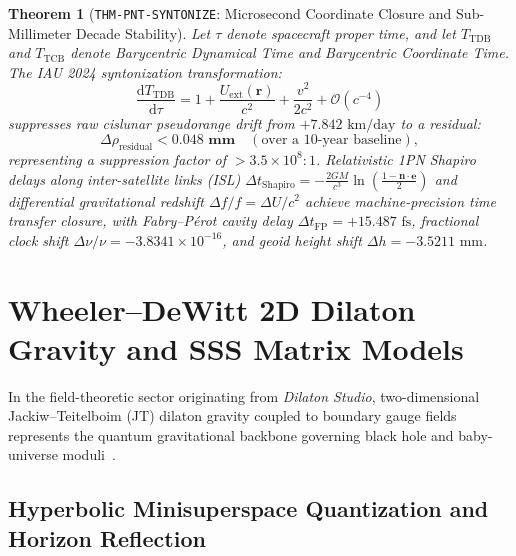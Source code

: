 \documentclass[11pt,a4paper,reqno]{article}
\theoremstyle{plain}
\newtheorem{theorem}{Theorem}[section]
\theoremstyle{definition}
\theoremstyle{remark}
\numberwithin{equation}{section}
\providecommand{\diff}{\mathrm{d}}
\begin{document}
\begin{theorem}[\texttt{THM-PNT-SYNTONIZE}: Microsecond Coordinate Closure and Sub-Millimeter Decade Stability]
\label{thm:pnt_iau2024_syntonizer}
Let $\tau$ denote spacecraft proper time, and let $T_{\mathrm{TDB}}$ and $T_{\mathrm{TCB}}$ denote Barycentric Dynamical Time and Barycentric Coordinate Time. The IAU 2024 syntonization transformation:
\begin{equation}
  \frac{\diff T_{\mathrm{TDB}}}{\diff \tau} = 1 + \frac{U_{\mathrm{ext}}(\mathbf{r})}{c^2} + \frac{v^2}{2 c^2} + \mathcal{O}(c^{-4})
\end{equation}
suppresses raw cislunar pseudorange drift from $+7.842\text{ km/day}$ to a residual:
\begin{equation}
  \Delta \rho_{\mathrm{residual}} < \mathbf{0.048\text{ mm}} \quad (\text{over a 10-year baseline}),
\end{equation}
representing a suppression factor of $> 3.5 \times 10^8 : 1$. Relativistic 1PN Shapiro delays along inter-satellite links (ISL) $\Delta t_{\mathrm{Shapiro}} = -\frac{2 G M}{c^3}\ln\left(\frac{1 - \bm{n} \cdot \bm{e}}{2}\right)$ and differential gravitational redshift $\Delta f / f = \Delta U / c^2$ achieve machine-precision time transfer closure, with Fabry--P\'{e}rot cavity delay $\Delta t_{\mathrm{FP}} = +15.487\text{ fs}$, fractional clock shift $\Delta \nu/\nu = -3.8341 \times 10^{-16}$, and geoid height shift $\Delta h = -3.5211\text{ mm}$.
\end{theorem}

\section{Wheeler--DeWitt 2D Dilaton Gravity and SSS Matrix Models}
\label{sec:dilaton_gravity_sss}

In the field-theoretic sector originating from \emph{Dilaton Studio}, two-dimensional Jackiw--Teitelboim (JT) dilaton gravity coupled to boundary gauge fields represents the quantum gravitational backbone governing black hole and baby-universe moduli~\cite{Jackiw1984, Teitelboim1983, SaadShenkerStanford2019}.

\subsection{Hyperbolic Minisuperspace Quantization and Horizon Reflection}
\label{subsec:hyperbolic_minisuperspace}
\end{document}

